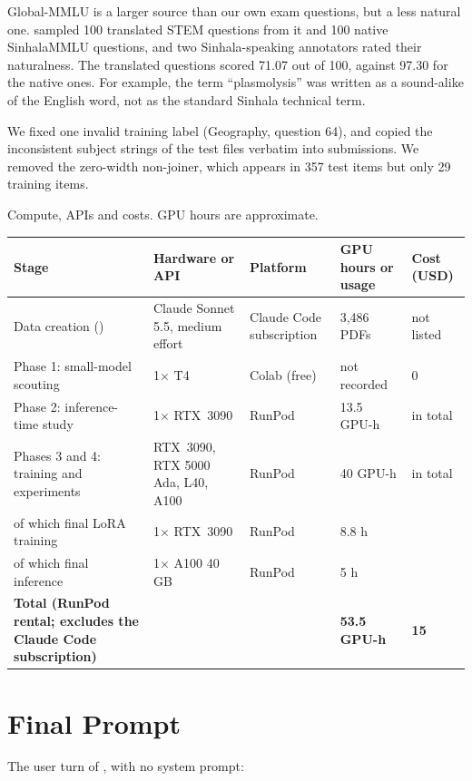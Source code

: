 Global-MMLU is a larger source than our own exam questions, but a less natural one. \citet{pramodya2025sinhalammlu} sampled 100 translated STEM questions from it and 100 native SinhalaMMLU questions, and two Sinhala-speaking annotators rated their naturalness. The translated questions scored 71.07 out of 100, against 97.30 for the native ones. For example, the term ``plasmolysis'' was written as a sound-alike of the English word, not as the standard Sinhala technical term.

 We fixed one invalid training label (Geography, question 64), and copied the inconsistent subject strings of the test files verbatim into submissions. We removed the zero-width non-joiner, which appears in 357 test items but only 29 training items.

\begin{center}\captionsetup{type=table}
\small
\caption{Compute, APIs and costs. GPU hours are approximate.}\label{tab:compute}
\begin{tabularx}{\textwidth}{@{}YL{0.25\textwidth}L{0.16\textwidth}L{0.15\textwidth}L{0.09\textwidth}@{}}
\toprule
Stage & Hardware or API & Platform & GPU hours or usage & Cost (USD) \\
\midrule
Data creation (\sinmulu{}) & Claude Sonnet 5.5, medium effort & Claude Code subscription & 3,486 PDFs & not listed \\
Phase 1: small-model scouting & 1$\times$ T4 & Colab (free) & not recorded & 0 \\
Phase 2: inference-time study & 1$\times$ RTX~3090 & RunPod & 13.5 GPU-h & in total \\
Phases 3 and 4: training and experiments & RTX~3090, RTX 5000 Ada, L40, A100 & RunPod & 40 GPU-h & in total \\
\quad of which final LoRA training & 1$\times$ RTX~3090 & RunPod & 8.8 h & \\
\quad of which final inference & 1$\times$ A100 40 GB & RunPod & 5 h & \\
\textbf{Total (RunPod rental; excludes the Claude Code subscription)} & & & \textbf{53.5 GPU-h} & \textbf{15} \\
\bottomrule
\end{tabularx}
\end{center}

\section{Final Prompt}\label{app:finalprompt}
The user turn of , with no system prompt:

